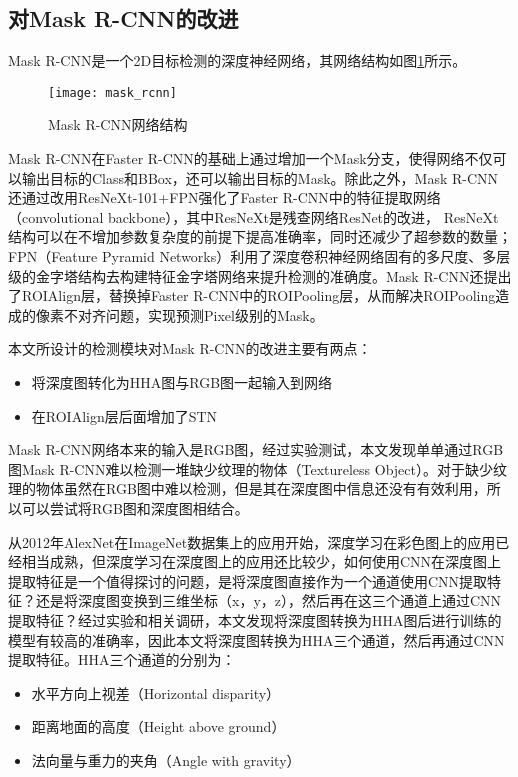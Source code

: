 \subsection{对Mask R-CNN的改进}
Mask R-CNN是一个2D目标检测的深度神经网络，其网络结构如图\ref{fig:mask_rcnn}所示。
\begin{figure}[ht]
  \centering
  \texttt{[image: mask\_rcnn]}
  \caption{Mask R-CNN网络结构}
  \label{fig:mask_rcnn}
\end{figure}
Mask R-CNN在Faster R-CNN的基础上通过增加一个Mask分支，使得网络不仅可以输出目标的Class和BBox，还可以输出目标的Mask。除此之外，Mask R-CNN还通过改用ResNeXt-101+FPN强化了Faster R-CNN中的特征提取网络（convolutional backbone），其中ResNeXt\cite{xie2017aggregated}是残查网络ResNet\cite{he2016deep}的改进， ResNeXt结构可以在不增加参数复杂度的前提下提高准确率，同时还减少了超参数的数量；FPN（Feature Pyramid Networks）\cite{lin2017feature}利用了深度卷积神经网络固有的多尺度、多层级的金字塔结构去构建特征金字塔网络来提升检测的准确度。Mask R-CNN还提出了ROIAlign层，替换掉Faster R-CNN中的ROIPooling层，从而解决ROIPooling造成的像素不对齐问题，实现预测Pixel级别的Mask。

本文所设计的检测模块对Mask R-CNN的改进主要有两点：
\begin{itemize}
\item 将深度图转化为HHA图与RGB图一起输入到网络
\item 在ROIAlign层后面增加了STN
\end{itemize}

Mask R-CNN网络本来的输入是RGB图，经过实验测试，本文发现单单通过RGB图Mask R-CNN难以检测一堆缺少纹理的物体（Textureless Object）。对于缺少纹理的物体虽然在RGB图中难以检测，但是其在深度图中信息还没有有效利用，所以可以尝试将RGB图和深度图相结合。

从2012年AlexNet\cite{Krizhevsky2012}在ImageNet\cite{imagenet}数据集上的应用开始，深度学习在彩色图上的应用已经相当成熟，但深度学习在深度图上的应用还比较少，如何使用CNN在深度图上提取特征是一个值得探讨的问题，是将深度图直接作为一个通道使用CNN提取特征？还是将深度图变换到三维坐标（x，y，z），然后再在这三个通道上通过CNN提取特征？经过实验和相关调研，本文发现将深度图转换为HHA图后进行训练的模型有较高的准确率\cite{Gupta2014}，因此本文将深度图转换为HHA三个通道，然后再通过CNN提取特征。HHA三个通道的分别为：
\begin{itemize}
\item 水平方向上视差（Horizontal disparity）
\item 距离地面的高度（Height above ground）
\item 法向量与重力的夹角（Angle with gravity）
\end{itemize}

